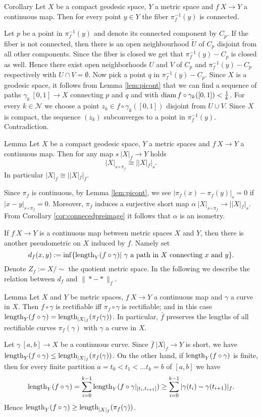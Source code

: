 \documentclass[a4paper,10pt]{amsart}
\begin{document}
\begin{thm}{Corollary}\label{cor:fiberconnected}
Let $X$ be a compact geodesic space, $Y$ a metric space and $f\:X\to Y$ a continuous map. Then
for every point $y\in Y$ the fiber $\pi_f^{-1}(y)$ is connected.
\end{thm}
Let $p$ be a point in $\pi_f^{-1}(y)$ and denote its connected component by $C_p$. If the fiber is not connected, then there is an
open neighbourhood $\tilde U$ of $C_p$ disjoint from all other components. Since the fiber is closed we get that $\pi_f^{-1}(y)-C_p$
is closed as well. Hence there exist open neighborhoods $U$ and $V$ of $C_p$ and $\pi_f^{-1}(y)-C_p$ respectively with $U\cap V=\emptyset$.
Now pick a point $q$ in  $\pi_f^{-1}(y)-C_p$. Since  $X$ is a geodesic space, it follows from Lemma \ref{lem:picont} that we can find a sequence
of paths $\gamma_k\:[0,1]\to X$ connecting $p$ and $q$ and with $\mathop{\rm diam}\nolimits f\circ\gamma_k([0,1])<\frac{1}{k}$. For every $k\in\mathcal{N}$ we choose a point 
$z_k\in f\circ\gamma_k([0,1])$ disjoint from $U\cup V$. Since $X$ is compact, the sequence $(z_k)$ subconverges to a point in $\pi_f^{-1}(y)$. Contradiction.
\qeds

\begin{thm}{Lemma}\label{lem:idem}
Let $X$ be a compact geodesic space, $Y$ a metric spaces and $f\:X\to Y$ a continuous map. Then for any map $s\:|X|_f\to Y$ holds
\[|X|_{s\circ\pi_f}\cong||X|_{f}|_s.\]
In particular $|X|_{f}\cong||X|_{f}|_{\bar f}$.
\end{thm}
 Since $\pi_f$ is continuous, by Lemma \ref{lem:picont}, we see $|\pi_f(x)-\pi_f(y)|_s=0$ if $|x-y|_{s\circ\pi_f}=0$. Moreover,
 $\pi_f$ induces a surjective short map $\alpha\:|X|_{s\circ\pi_f}\to||X|_{f}|_s$. From Corollary \ref{cor:connecedpreimage} it follows that
 $\alpha$ is an isometry.
\qeds


If $f\:X\to Y$ is a continuous map between metric spaces $X$ and $Y$, then there is another pseudometric on $X$ induced by $f$. Namely set 
\[d_f(x,y):=\inf\{\mathop{\rm length}\nolimits_Y(f\circ\gamma)|\ \gamma \text{ a path in } X\text{ connecting }x\text{ and }y\}.\]
Denote $Z_f:=X/\sim$ the quotient metric space. In the following we describe the relation between $d_f$ and $\|*-*\|_f$.

\begin{thm}{Lemma}\label{lem:intrinsicmetric}
Let $X$ and $Y$ be metric spaces, $f\:X\to Y$ a continuous map and $\gamma$ a curve in $X$. Then $f\circ\gamma$
is rectifiable iff $\pi_f\circ\gamma$ is rectifiable; and in this case $\mathop{\rm length}\nolimits_Y(f\circ\gamma)=\mathop{\rm length}\nolimits_{|X|_f}(\pi_f(\gamma))$.
In particular, $\bar f$ preserves the lengths of all rectifiable curves $\pi_f(\gamma)$ with $\gamma$ a curve in $X$.
\end{thm}
Let $\gamma\:[a,b]\to X$ be a continuous curve.
Since $\bar f\:|X|_f\to Y$ is short, we have $\mathop{\rm length}\nolimits_Y(f\circ \gamma)\leq\mathop{\rm length}\nolimits_{|X|_f}(\pi_f(\gamma))$. On the other hand,
if $\mathop{\rm length}\nolimits_Y(f\circ \gamma)$ is finite, then for every finite partition ${a=t_0<t_1<\ldots t_k=b}$ of $[a,b]$ we have
\[\mathop{\rm length}\nolimits_Y(f\circ \gamma)=\sum_{i=0}^{k-1}\mathop{\rm length}\nolimits_Y(f\circ \gamma|_{[t_i,t_{i+1}]})\geq\sum_{i=0}^{k-1}|\gamma(t_i)-\gamma(t_{i+1})|_f.\]
Hence $\mathop{\rm length}\nolimits_Y(f\circ \gamma)\geq\mathop{\rm length}\nolimits_{|X|_f}(\pi_f(\gamma))$.
\qeds
\end{document}
